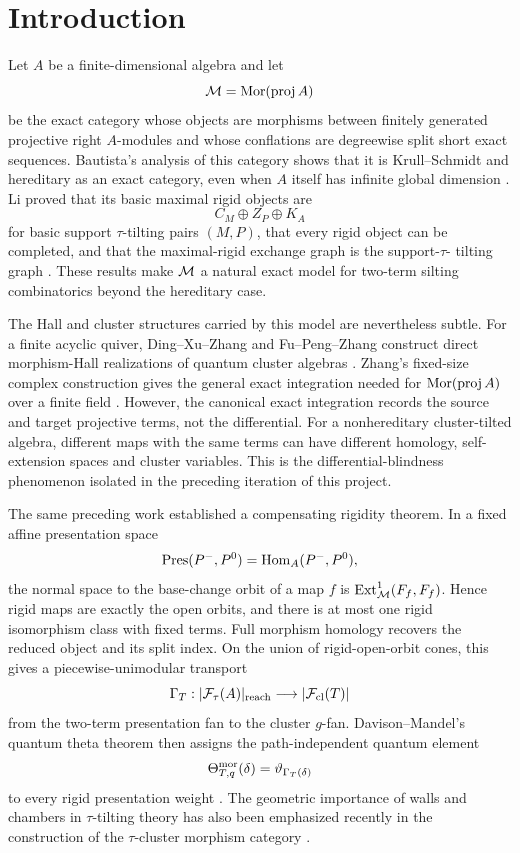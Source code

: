 \section{Introduction}
\label{sec:introduction}

Let $A$ be a finite-dimensional algebra and let
\[
 \mathcal M=\operatorname{Mor}(\operatorname{proj} A)
\]
be the exact category whose objects are morphisms between finitely generated
projective right $A$-modules and whose conflations are degreewise split short
exact sequences.  Bautista's analysis of this category shows that it is
Krull--Schmidt and hereditary as an exact category, even when $A$ itself has
infinite global dimension \cite{Bautista}.  Li proved that its basic maximal
rigid objects are
\[
 C_M\oplus Z_P\oplus K_A
\]
for basic support $\tau$-tilting pairs $(M,P)$, that every rigid object can be
completed, and that the maximal-rigid exchange graph is the support-$\tau$-
tilting graph \cite{Li}.  These results make $\mathcal M$ a natural exact model for
two-term silting combinatorics beyond the hereditary case.

The Hall and cluster structures carried by this model are nevertheless
subtle.  For a finite acyclic quiver, Ding--Xu--Zhang and Fu--Peng--Zhang
construct direct morphism-Hall realizations of quantum cluster algebras
\cite{DingXuZhang,FuPengZhang}.  Zhang's fixed-size complex construction gives
the general exact integration needed for $\operatorname{Mor}(\operatorname{proj} A)$ over a finite field
\cite{ZhangFixedSize}.  However, the canonical exact integration records the
source and target projective terms, not the differential.  For a
nonhereditary cluster-tilted algebra, different maps with the same terms can
have different homology, self-extension spaces and cluster variables.  This
is the differential-blindness phenomenon isolated in the preceding
iteration of this project.

The same preceding work established a compensating rigidity theorem.  In a
fixed affine presentation space
\[
 \operatorname{Pres}(P^-,P^0)=\operatorname{Hom}_A(P^-,P^0),
\]
the normal space to the base-change orbit of a map $f$ is
$\operatorname{Ext}^1_{\mathcal M}(F_f,F_f)$.  Hence rigid maps are exactly the open orbits, and
there is at most one rigid isomorphism class with fixed terms.  Full morphism
homology recovers the reduced object and its split index.  On the union of
rigid-open-orbit cones, this gives a piecewise-unimodular transport
\[
 \Gamma_T:\lvert\mathcal F_\tau(A)\rvert_{\mathrm{reach}}
 \longrightarrow
 \lvert\mathcal F_{\mathrm{cl}}(T)\rvert
\]
from the two-term presentation fan to the cluster $g$-fan.  Davison--Mandel's
quantum theta theorem then assigns the path-independent quantum element
\[
 \Theta^{\mathrm{mor}}_{T,q}(\delta)
 =\vartheta_{\Gamma_T(\delta)}
\]
to every rigid presentation weight \cite{DavisonMandel}.  The geometric
importance of walls and chambers in $\tau$-tilting theory has also been
emphasized recently in the construction of the $\tau$-cluster morphism
category \cite{SchrollTattarTreffingerWilliams}.


